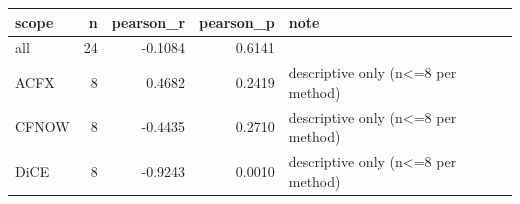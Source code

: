\begin{tabular}{lrrrl}
\toprule
scope &  n &  pearson\_r &  pearson\_p &                               note \\
\midrule
  all & 24 &    -0.1084 &     0.6141 &                                    \\
 ACFX &  8 &     0.4682 &     0.2419 & descriptive only (n<=8 per method) \\
CFNOW &  8 &    -0.4435 &     0.2710 & descriptive only (n<=8 per method) \\
 DiCE &  8 &    -0.9243 &     0.0010 & descriptive only (n<=8 per method) \\
\bottomrule
\end{tabular}
